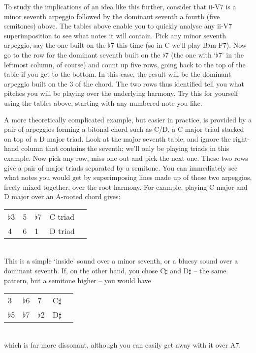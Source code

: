 \documentclass[english]{./gbook}
\begin{document}
\begin{large}
To study the implications of an idea like this further, consider that ii-V7 is a minor seventh arpeggio followed by the dominant seventh a fourth (five semitones) above. The tables above enable you to quickly analyse any ii-V7 superimposition to see what notes it will contain. Pick any minor seventh arpeggio, say the one built on the $\flat$7 this time (so in C we'll play B$\flat$m-F7). Now go to the row for the dominant seventh built on the $\flat$7 (the one with `$\flat$7' in the leftmost column, of course) and count up five rows, going back to the top of the table if you get to the bottom. In this case, the result will be the dominant arpeggio built on the 3 of the chord. The two rows thus identified tell you what pitches you will be playing over the underlying harmony. Try this for yourself using the tables above, starting with any numbered note you like.

A more theoretically complicated example, but easier in practice, is provided by a pair of arpeggios forming a bitonal chord such as C/D, a C major triad stacked on top of a D major triad. Look at the major seventh table, and ignore the right-hand column that contains the seventh; we'll only be playing triads in this example. Now pick any row, miss one out and pick the next one. These two rows give a pair of major triads separated by a semitone. You can immediately see what notes you would get by superimposing lines made up of these two arpeggios, freely mixed together, over the root harmony. For example, playing C major and D major over an A-rooted chord gives:\\
\begin{tabular}{lllll}
$\flat$3	&    5	&   $\flat$7	&   C triad  \\  
4	&    6	&   1	&   		   D triad  
\end{tabular}\\
This is a simple `inside' sound over a minor seventh, or a bluesy sound over a dominant seventh. If, on the other hand, you chose C$\sharp$ and D$\sharp$ -- the same pattern, but a semitone higher -- you would have\\
\begin{tabular}{lllll}
3	&    $\flat$6	&   7	&   C$\sharp$         \\  
$\flat$5	&    $\flat$7	&   $\flat$2	&   D$\sharp$ 
\end{tabular}\\
which is far more dissonant, although you can easily get away with it over A7.





\end{large}
\end{document}
